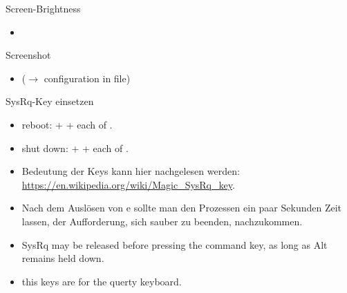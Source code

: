 \begin{frame}[fragile]{Screen-Brightness}
  \begin{itemize}
    \item {}
  \end{itemize}
\end{frame}

\begin{frame}[fragile]{Screenshot}
  \begin{itemize}
    \item {} ($\rightarrow$ configuration in  file)
  \end{itemize}
\end{frame}

\begin{frame}[fragile]{SysRq-Key einsetzen}
  \begin{itemize}
    \item \alert{reboot:}  +  + each of .
    \item \alert{shut down:}  +  + each of .
    \item Bedeutung der Keys kann hier nachgelesen werden: \url{https://en.wikipedia.org/wiki/Magic_SysRq_key}.
  \end{itemize}
  \begin{Sidenote}
    \begin{itemize}
      \item Nach dem Auslösen von e sollte man den Prozessen ein paar Sekunden Zeit lassen, der Aufforderung, sich sauber zu beenden, nachzukommen.
      \item SysRq may be released before pressing the command key, as long as Alt remains held down.
      \item this keys are for the querty keyboard.
    \end{itemize}
  \end{Sidenote}
\end{frame}

